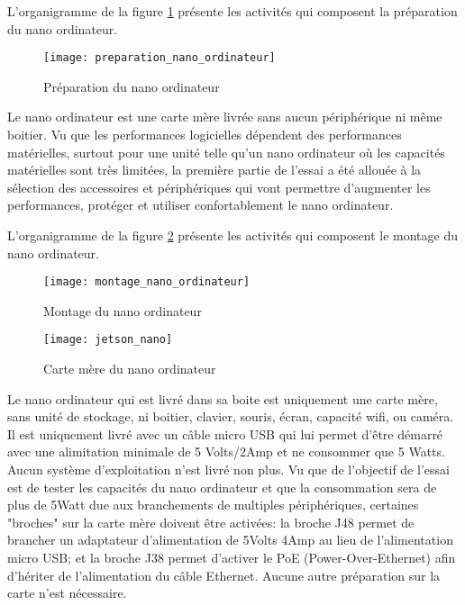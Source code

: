 ﻿\label{preparation_nano_ordinateur}
\par L'organigramme de la figure \ref{fig:preparation_nano_ordinateur} présente les activités qui composent la préparation du nano ordinateur. 
\begin{figure}[H]
    \centering
    \texttt{[image: preparation\_nano\_ordinateur]}
    \caption{Préparation du nano ordinateur}
    \label{fig:preparation_nano_ordinateur}
\end{figure}
\par Le nano ordinateur est une carte mère livrée sans aucun périphérique ni même boitier. Vu que les performances logicielles dépendent des performances matérielles, surtout pour une unité telle qu'un nano ordinateur où les capacités matérielles sont très limitées, la première partie de l'essai a été allouée à la sélection des accessoires et périphériques qui vont permettre d'augmenter les performances, protéger et utiliser confortablement le nano ordinateur. 
\label{montage_nano_ordinateur}
\par L'organigramme de la figure \ref{fig:montage_nano_ordinateur} présente les activités qui composent le montage du nano ordinateur. 
\begin{figure}[H]
    \centering
    \texttt{[image: montage\_nano\_ordinateur]}
    \caption{Montage du nano ordinateur}
    \label{fig:montage_nano_ordinateur}
\end{figure}
\begin{figure}[H]
\centering
    \texttt{[image: jetson\_nano]}
    \caption{Carte mère du nano ordinateur}
    \label{fig:jetson_nano}
\end{figure}
\par Le nano ordinateur qui est livré dans sa boite est uniquement une carte mère, sans unité de stockage, ni boitier, clavier, souris, écran, capacité wifi, ou caméra. Il est uniquement livré avec un câble micro USB qui lui permet d'être démarré avec une alimitation minimale de 5 Volts/2Amp et ne consommer que 5 Watts. Aucun système d'exploitation n'est livré non plus. Vu que de l'objectif de l'essai est de tester les capacités du nano ordinateur et que la consommation sera de plus de 5Watt due aux branchements de multiples périphériques, certaines "broches" sur la carte mère doivent être activées:  la broche J48 permet de brancher un adaptateur d'alimentation de 5Volts 4Amp au lieu de l'alimentation micro USB; et la broche J38 permet d'activer le PoE (Power-Over-Ethernet) afin d'hériter de l'alimentation du câble Ethernet. Aucune autre préparation sur la carte n'est nécessaire.

